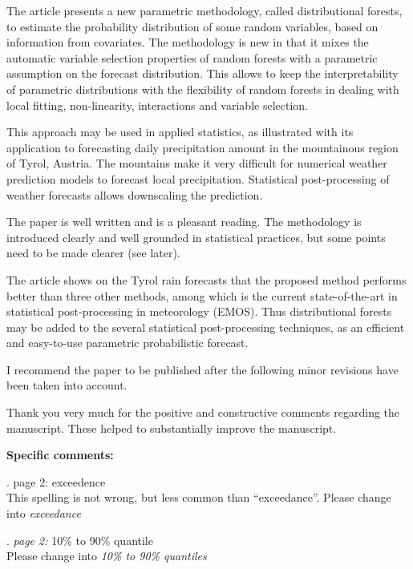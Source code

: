\documentclass[american,foldmarks=false,noconfig]{uibklttr}
\newenvironment{review}{\fontshape{\itdefault}\fontseries{\bfdefault} \selectfont \smallskip}{\par}
\begin{document}
\begin{review}
The article presents a new parametric methodology, called 
distributional forests, to estimate the probability 
distribution of some random variables, based on information 
from covariates. The methodology is new in that it mixes the
automatic variable selection properties of random forests 
with a parametric assumption on the forecast distribution. 
This allows to keep the interpretability of parametric 
distributions with the flexibility of random forests in 
dealing with local fitting, non-linearity, interactions 
and variable selection.

This approach may be used in applied statistics, as 
illustrated with its application to forecasting daily 
precipitation amount in the mountainous region of Tyrol, 
Austria. The mountains make it very difficult for numerical 
weather prediction models to forecast local precipitation. 
Statistical post-processing of weather forecasts allows 
downscaling the prediction.

The paper is well written and is a pleasant reading. 
The methodology is introduced clearly and well grounded 
in statistical practices, but some points need to be 
made clearer (see later).

The article shows on the Tyrol rain forecasts that the 
proposed method performs better than three other methods, 
among which is the current state-of-the-art in statistical 
post-processing in meteorology (EMOS). Thus distributional
forests may be added to the several statistical post-processing 
techniques, as an efficient and easy-to-use parametric 
probabilistic forecast.

I recommend the paper to be published after the following 
minor revisions have been taken into account.
\end{review}

Thank you very much for the positive and constructive 
comments regarding the manuscript. These helped to 
substantially improve the manuscript.

\bigskip

\textbf{Specific comments:}

\begin{review}
1. {\color{quotecolor} page 2: exceedence}\\
This spelling is not wrong, but less common than ``exceedance''.
Please change into \textit{exceedance}
\end{review}

\begin{review}
2. {\color{quotecolor}\textit{page 2:} 10$\%$ to 90\% quantile}\\
Please change into \textit{10\% to 90\% quantiles}
\end{review}
\end{document}
